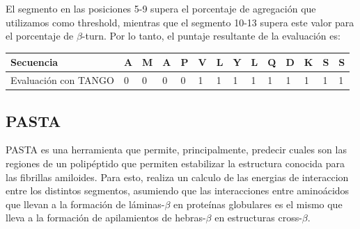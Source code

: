 \vspace{0.5cm}
El segmento en las posiciones 5-9 supera el porcentaje de agregación que utilizamos como threshold, mientras que el segmento 10-13 supera este valor para el porcentaje de $\beta$-turn.
Por lo tanto, el puntaje resultante de la evaluación es:

\vspace{0.5cm}
\noindent
\begin{tabular}{llllllllllllll} 
\hline      		
Secuencia & \textbf{A} & \textbf{M} & \textbf{A} & \textbf{P} & \textbf{V} & \textbf{L} & \textbf{Y} & \textbf{L} & \textbf{Q} & \textbf{D} & \textbf{K} & \textbf{S} & \textbf{S} \\ \hline
Evaluación con TANGO & 0 & 0 & 0 & 0 & 1 & 1 & 1 & 1 & 1 & 1 & 1 & 1 & 1 \\ \hline
\end{tabular}





% 








\subsection{PASTA}\label{pasta}


PASTA\cite{trovato2006insight} es una herramienta que permite, principalmente, predecir cuales son las regiones de un polipéptido que permiten estabilizar la estructura conocida para las fibrillas amiloides.
Para esto, realiza un calculo de las energias de interaccion entre los distintos segmentos, asumiendo que las interacciones entre aminoácidos que llevan a la formación 
de láminas-$\beta$ en proteínas globulares es el mismo que lleva a la formación de apilamientos de hebras-$\beta$ en estructuras cross-$\beta$.

